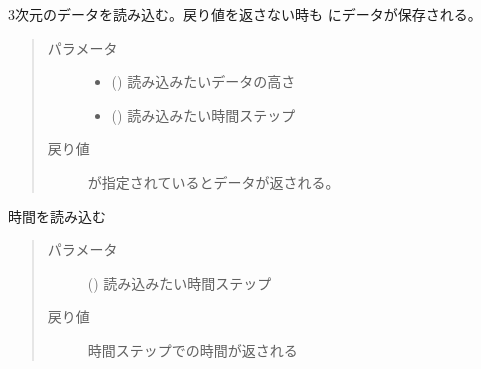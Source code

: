 \documentclass[letterpaper,10pt,dvipdfmx,report]{sphinxmanual}
\begin{document}
\begin{fulllineitems}
\label{\detokenize{io:read_qq}}
3次元のデータを読み込む。戻り値を返さない時も  にデータが保存される。
\begin{quote}\begin{description}
\item[{パラメータ}] \leavevmode\begin{itemize}
\item {} 
 () \sphinxhyphen{}\sphinxhyphen{} 読み込みたいデータの高さ

\item {} 
 () \sphinxhyphen{}\sphinxhyphen{} 読み込みたい時間ステップ

\end{itemize}

\item[{戻り値}] \leavevmode
{} が指定されているとデータが返される。

\end{description}\end{quote}

\end{fulllineitems}


\begin{fulllineitems}
\label{\detokenize{io:read_time}}
時間を読み込む
\begin{quote}\begin{description}
\item[{パラメータ}] \leavevmode
{} () \sphinxhyphen{}\sphinxhyphen{} 読み込みたい時間ステップ

\item[{戻り値}] \leavevmode
時間ステップでの時間が返される

\end{description}\end{quote}

\end{fulllineitems}
\end{document}
